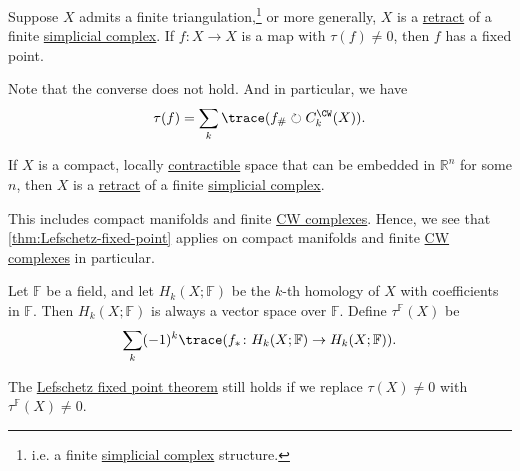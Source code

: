 \begin{theorem}\label{thm:Lefschetz-fixed-point}
	Suppose \(X\) admits a finite triangulation,\footnote{i.e. a finite \hyperref[def:simplicial-complex]{simplicial complex} structure.} or more generally, \(X\) is a \hyperref[def:retraction]{retract} of a finite \hyperref[def:simplicial-complex]{simplicial complex}. If \(f \colon X \to X\) is a map with \(\tau(f) \neq 0\), then \(f\) has a fixed point.
\end{theorem}
\begin{note}
	Note that the converse does not hold. And in particular, we have
	\[
		\tau (f) = \sum\limits_{k} \trace(f_\# \circlearrowright C^{\CW}_k(X) ).
	\]
\end{note}

\begin{theorem}\label{thm:retract-simplicial-complex}
	If \(X\) is a compact, locally \hyperref[def:contractible]{contractible} space that can be embedded in \(\mathbb{R}^n\) for some \(n\), then \(X\) is a \hyperref[def:retraction]{retract} of a finite \hyperref[def:simplicial-complex]{simplicial complex}.
\end{theorem}

\begin{remark}
	This includes compact manifolds and finite \hyperref[def:CW-Complex]{CW complexes}. Hence, we see that \autoref{thm:Lefschetz-fixed-point} applies on compact manifolds and finite \hyperref[def:CW-Complex]{CW complexes} in particular.
\end{remark}

\begin{definition}\label{def:Lefschetz-number-better}
	Let \(\mathbb{F}\) be a field, and let \(H_k(X; \mathbb{F})\) be the \(k\)-th homology of \(X\) with coefficients in \(\mathbb{F}\). Then \(H_k(X; \mathbb{F})\) is always a vector space over \(\mathbb{F}\). Define \(\tau^{\mathbb{F}}(X)\) be
	\[
		\sum_k (-1)^k \trace(f_\ast \colon H_k(X; \mathbb{F}) \to H_k(X; \mathbb{F})).
	\]
\end{definition}

\begin{remark}
	The \hyperref[thm:Lefschetz-fixed-point]{Lefschetz fixed point theorem} still holds if we replace \(\tau(X) \neq 0\) with \(\tau^{\mathbb{F}}(X) \neq 0\).
\end{remark}